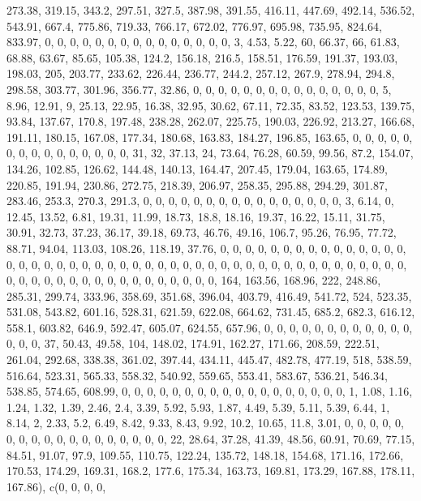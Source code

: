 \documentclass[
]{article}
\begin{document}
273.38, 319.15, 343.2, 297.51, 327.5, 387.98, 391.55, 416.11, 447.69,
492.14, 536.52, 543.91, 667.4, 775.86, 719.33, 766.17, 672.02, 776.97,
695.98, 735.95, 824.64, 833.97, 0, 0, 0, 0, 0, 0, 0, 0, 0, 0, 0, 0, 0,
0, 0, 3, 4.53, 5.22, 60, 66.37, 66, 61.83, 68.88, 63.67, 85.65, 105.38,
124.2, 156.18, 216.5, 158.51, 176.59, 191.37, 193.03, 198.03, 205,
203.77, 233.62, 226.44, 236.77, 244.2, 257.12, 267.9, 278.94, 294.8,
298.58, 303.77, 301.96, 356.77, 32.86, 0, 0, 0, 0, 0, 0, 0, 0, 0, 0, 0,
0, 0, 0, 0, 5, 8.96, 12.91, 9, 25.13, 22.95, 16.38, 32.95, 30.62, 67.11,
72.35, 83.52, 123.53, 139.75, 93.84, 137.67, 170.8, 197.48, 238.28,
262.07, 225.75, 190.03, 226.92, 213.27, 166.68, 191.11, 180.15, 167.08,
177.34, 180.68, 163.83, 184.27, 196.85, 163.65, 0, 0, 0, 0, 0, 0, 0, 0,
0, 0, 0, 0, 0, 0, 0, 31, 32, 37.13, 24, 73.64, 76.28, 60.59, 99.56,
87.2, 154.07, 134.26, 102.85, 126.62, 144.48, 140.13, 164.47, 207.45,
179.04, 163.65, 174.89, 220.85, 191.94, 230.86, 272.75, 218.39, 206.97,
258.35, 295.88, 294.29, 301.87, 283.46, 253.3, 270.3, 291.3, 0, 0, 0, 0,
0, 0, 0, 0, 0, 0, 0, 0, 0, 0, 0, 0, 3, 6.14, 0, 12.45, 13.52, 6.81,
19.31, 11.99, 18.73, 18.8, 18.16, 19.37, 16.22, 15.11, 31.75, 30.91,
32.73, 37.23, 36.17, 39.18, 69.73, 46.76, 49.16, 106.7, 95.26, 76.95,
77.72, 88.71, 94.04, 113.03, 108.26, 118.19, 37.76, 0, 0, 0, 0, 0, 0, 0,
0, 0, 0, 0, 0, 0, 0, 0, 0, 0, 0, 0, 0, 0, 0, 0, 0, 0, 0, 0, 0, 0, 0, 0,
0, 0, 0, 0, 0, 0, 0, 0, 0, 0, 0, 0, 0, 0, 0, 0, 0, 0, 0, 0, 0, 0, 0, 0,
0, 0, 0, 0, 0, 0, 0, 0, 0, 164, 163.56, 168.96, 222, 248.86, 285.31,
299.74, 333.96, 358.69, 351.68, 396.04, 403.79, 416.49, 541.72, 524,
523.35, 531.08, 543.82, 601.16, 528.31, 621.59, 622.08, 664.62, 731.45,
685.2, 682.3, 616.12, 558.1, 603.82, 646.9, 592.47, 605.07, 624.55,
657.96, 0, 0, 0, 0, 0, 0, 0, 0, 0, 0, 0, 0, 0, 0, 0, 37, 50.43, 49.58,
104, 148.02, 174.91, 162.27, 171.66, 208.59, 222.51, 261.04, 292.68,
338.38, 361.02, 397.44, 434.11, 445.47, 482.78, 477.19, 518, 538.59,
516.64, 523.31, 565.33, 558.32, 540.92, 559.65, 553.41, 583.67, 536.21,
546.34, 538.85, 574.65, 608.99, 0, 0, 0, 0, 0, 0, 0, 0, 0, 0, 0, 0, 0,
0, 0, 0, 0, 0, 1, 1.08, 1.16, 1.24, 1.32, 1.39, 2.46, 2.4, 3.39, 5.92,
5.93, 1.87, 4.49, 5.39, 5.11, 5.39, 6.44, 1, 8.14, 2, 2.33, 5.2, 6.49,
8.42, 9.33, 8.43, 9.92, 10.2, 10.65, 11.8, 3.01, 0, 0, 0, 0, 0, 0, 0, 0,
0, 0, 0, 0, 0, 0, 0, 0, 0, 0, 22, 28.64, 37.28, 41.39, 48.56, 60.91,
70.69, 77.15, 84.51, 91.07, 97.9, 109.55, 110.75, 122.24, 135.72,
148.18, 154.68, 171.16, 172.66, 170.53, 174.29, 169.31, 168.2, 177.6,
175.34, 163.73, 169.81, 173.29, 167.88, 178.11, 167.86), c(0, 0, 0, 0,
\end{document}
